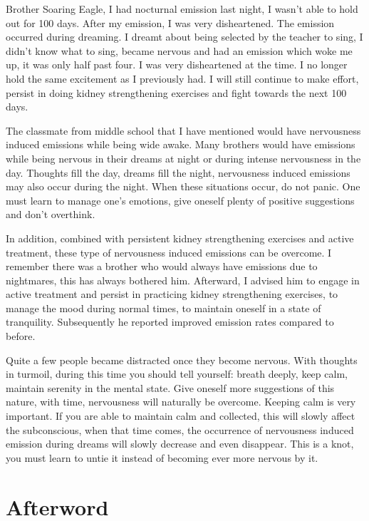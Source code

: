 \documentclass[
]{book}
\begin{document}
Brother Soaring Eagle, I had nocturnal emission last night, I wasn't able to hold out for 100 days. After my emission, I was very disheartened. The emission occurred during dreaming. I dreamt about being selected by the teacher to sing, I didn't know what to sing, became nervous and had an emission which woke me up, it was only half past four. I was very disheartened at the time. I no longer hold the same excitement as I previously had. I will still continue to make effort, persist in doing kidney strengthening exercises and fight towards the next 100 days.

The classmate from middle school that I have mentioned would have nervousness induced emissions while being wide awake. Many brothers would have emissions while being nervous in their dreams at night or during intense nervousness in the day. Thoughts fill the day, dreams fill the night, nervousness induced emissions may also occur during the night. When these situations occur, do not panic. One must learn to manage one's emotions, give oneself plenty of positive suggestions and don't overthink.

In addition, combined with persistent kidney strengthening exercises and active treatment, these type of nervousness induced emissions can be overcome. I remember there was a brother who would always have emissions due to nightmares, this has always bothered him. Afterward, I advised him to engage in active treatment and persist in practicing kidney strengthening exercises, to manage the mood during normal times, to maintain oneself in a state of tranquility. Subsequently he reported improved emission rates compared to before.

Quite a few people became distracted once they become nervous. With thoughts in turmoil, during this time you should tell yourself: breath deeply, keep calm, maintain serenity in the mental state. Give oneself more suggestions of this nature, with time, nervousness will naturally be overcome. Keeping calm is very important. If you are able to maintain calm and collected, this will slowly affect the subconscious, when that time comes, the occurrence of nervousness induced emission during dreams will slowly decrease and even disappear. This is a knot, you must learn to untie it instead of becoming ever more nervous by it.

\hypertarget{afterword-8}{%
\section{Afterword}\label{afterword-8}}
\end{document}
